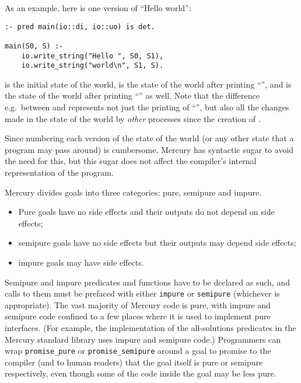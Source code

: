As an example, here is one version of ``Hello world'':
\vspace{3mm}
\begin{verbatim}
:- pred main(io::di, io::uo) is det.

main(S0, S) :-
    io.write_string("Hello ", S0, S1),
    io.write_string("world\n", S1, S).
\end{verbatim}
\vspace{3mm}

\noindent
 is the initial state of the world,
 is the state of the world after printing ``'',
and  is the state of the world
after printing ``'' as well.
Note that the difference e.g.\ between  and 
represents not just the printing of ``'',
but also all the changes made in the state of the world
by \emph{other} processes since the creation of .

Since numbering each version of the state of the world
(or any other state that a program may pass around) is cumbersome,
Mercury has syntactic sugar to avoid the need for this,
but this sugar does not affect
the compiler's internal representation of the program.

\noindent
Mercury divides goals into three categories:
pure, semipure and impure.

\begin{itemize}

    \item
    Pure goals have no side effects
    and their outputs do not depend on side effects;

    \item
    semipure goals have no side effects
    but their outputs may depend side effects;

    \item
    impure goals may have side effects.

\end{itemize}

\noindent
Semipure and impure predicates and functions
have to be declared as such,
and calls to them must be prefaced with either
\verb|impure| or \verb|semipure| (whichever is appropriate).
The vast majority of Mercury code is pure,
with impure and semipure code confined to a few places
where it is used to implement pure interfaces.
(For example, the implementation of the all-solutions predicates
in the Mercury standard library uses impure and semipure code.)
Programmers can wrap
\verb|promise_pure| or \verb|promise_semipure| around a goal
to promise to the compiler (and to human readers) that
the goal itself is pure or semipure respectively,
even though some of the code inside the goal may be less pure.


